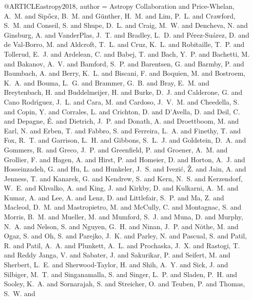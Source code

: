 @ARTICLE{astropy2018,
   author = {{Astropy Collaboration} and {Price-Whelan}, A.~M. and {Sip{\H o}cz}, B.~M. and 
	{G{\"u}nther}, H.~M. and {Lim}, P.~L. and {Crawford}, S.~M. and 
	{Conseil}, S. and {Shupe}, D.~L. and {Craig}, M.~W. and {Dencheva}, N. and 
	{Ginsburg}, A. and {VanderPlas}, J.~T. and {Bradley}, L.~D. and 
	{P{\'e}rez-Su{\'a}rez}, D. and {de Val-Borro}, M. and {Aldcroft}, T.~L. and 
	{Cruz}, K.~L. and {Robitaille}, T.~P. and {Tollerud}, E.~J. and 
	{Ardelean}, C. and {Babej}, T. and {Bach}, Y.~P. and {Bachetti}, M. and 
	{Bakanov}, A.~V. and {Bamford}, S.~P. and {Barentsen}, G. and 
	{Barmby}, P. and {Baumbach}, A. and {Berry}, K.~L. and {Biscani}, F. and 
	{Boquien}, M. and {Bostroem}, K.~A. and {Bouma}, L.~G. and {Brammer}, G.~B. and 
	{Bray}, E.~M. and {Breytenbach}, H. and {Buddelmeijer}, H. and 
	{Burke}, D.~J. and {Calderone}, G. and {Cano Rodr{\'{\i}}guez}, J.~L. and 
	{Cara}, M. and {Cardoso}, J.~V.~M. and {Cheedella}, S. and {Copin}, Y. and 
	{Corrales}, L. and {Crichton}, D. and {D'Avella}, D. and {Deil}, C. and 
	{Depagne}, {\'E}. and {Dietrich}, J.~P. and {Donath}, A. and 
	{Droettboom}, M. and {Earl}, N. and {Erben}, T. and {Fabbro}, S. and 
	{Ferreira}, L.~A. and {Finethy}, T. and {Fox}, R.~T. and {Garrison}, L.~H. and 
	{Gibbons}, S.~L.~J. and {Goldstein}, D.~A. and {Gommers}, R. and 
	{Greco}, J.~P. and {Greenfield}, P. and {Groener}, A.~M. and 
	{Grollier}, F. and {Hagen}, A. and {Hirst}, P. and {Homeier}, D. and 
	{Horton}, A.~J. and {Hosseinzadeh}, G. and {Hu}, L. and {Hunkeler}, J.~S. and 
	{Ivezi{\'c}}, {\v Z}. and {Jain}, A. and {Jenness}, T. and {Kanarek}, G. and 
	{Kendrew}, S. and {Kern}, N.~S. and {Kerzendorf}, W.~E. and 
	{Khvalko}, A. and {King}, J. and {Kirkby}, D. and {Kulkarni}, A.~M. and 
	{Kumar}, A. and {Lee}, A. and {Lenz}, D. and {Littlefair}, S.~P. and 
	{Ma}, Z. and {Macleod}, D.~M. and {Mastropietro}, M. and {McCully}, C. and 
	{Montagnac}, S. and {Morris}, B.~M. and {Mueller}, M. and {Mumford}, S.~J. and 
	{Muna}, D. and {Murphy}, N.~A. and {Nelson}, S. and {Nguyen}, G.~H. and 
	{Ninan}, J.~P. and {N{\"o}the}, M. and {Ogaz}, S. and {Oh}, S. and 
	{Parejko}, J.~K. and {Parley}, N. and {Pascual}, S. and {Patil}, R. and 
	{Patil}, A.~A. and {Plunkett}, A.~L. and {Prochaska}, J.~X. and 
	{Rastogi}, T. and {Reddy Janga}, V. and {Sabater}, J. and {Sakurikar}, P. and 
	{Seifert}, M. and {Sherbert}, L.~E. and {Sherwood-Taylor}, H. and 
	{Shih}, A.~Y. and {Sick}, J. and {Silbiger}, M.~T. and {Singanamalla}, S. and 
	{Singer}, L.~P. and {Sladen}, P.~H. and {Sooley}, K.~A. and 
	{Sornarajah}, S. and {Streicher}, O. and {Teuben}, P. and {Thomas}, S.~W. and 
}}
